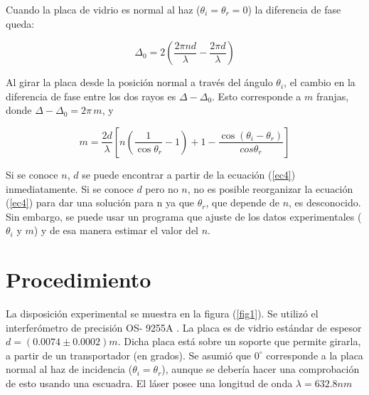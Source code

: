 \documentclass[a4paper, amsfonts, amssymb, amsmath, reprint, showkeys, nofootinbib, twoside]{revtex4-2}
\begin{document}
Cuando la placa de vidrio es normal al haz ($\theta_i=\theta_r = 0$) la diferencia de fase queda:

\[\Delta_0 = 2\left(\frac{2\pi n d}{\lambda}-\frac{2\pi d}{\lambda}\right)\]

Al girar la placa desde la posición normal a través del ángulo $\theta_i$, el cambio en la diferencia de fase entre los dos rayos es $\Delta - \Delta_0$. Esto corresponde a $m$ franjas, donde $\Delta -\Delta_0 = 2\pi\, m$, y

\begin{equation}\label{ec4}
m = \frac{2d}{\lambda}\left[n\left(\frac{1}{\cos \theta_r} -1\right)+1 - \frac{\cos (\theta_i -\theta_r)}{cos \theta_r}\right]
\end{equation}

Si se conoce $n$, $d$ se puede encontrar a partir de la ecuación (\ref{ec4}) inmediatamente. Si se conoce $d$ pero no $n$, no es posible reorganizar la ecuación (\ref{ec4}) para dar una solución para n ya que $\theta_r$, que depende de $n$, es desconocido. Sin embargo, se puede usar un programa que ajuste de los datos experimentales ($\theta_i$ y $m$) y de esa manera estimar el valor del $n$.

\section{Procedimiento}
La disposición experimental se muestra en la figura (\ref{fig1}). Se utilizó el interferómetro de precisión OS- 9255A \cite{pasco}. La placa es de vidrio estándar de espesor $d=(0.0074 \pm 0.0002)m$. Dicha placa está sobre un soporte que permite girarla, a partir de un transportador (en grados). Se asumió que  $0^{\circ}$ corresponde a la placa normal al haz de incidencia ($\theta_i = \theta_r$), aunque se debería hacer una comprobación de esto usando una escuadra. El láser posee una longitud de onda $\lambda = 632.8 nm$ 
\end{document}
